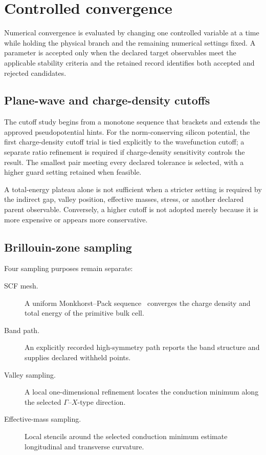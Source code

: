 \section{Controlled convergence}


Numerical convergence is evaluated by changing one controlled variable at a
time while holding the physical branch and the remaining numerical settings
fixed. A parameter is accepted only when the declared target observables meet
the applicable stability criteria and the retained record identifies both
accepted and rejected candidates.

\subsection{Plane-wave and charge-density cutoffs}


The cutoff study begins from a monotone sequence that brackets and extends the
approved pseudopotential hints. For the norm-conserving silicon potential, the
first charge-density cutoff trial is tied explicitly to the wavefunction cutoff;
a separate ratio refinement is required if charge-density sensitivity controls
the result. The smallest pair meeting every declared tolerance is selected,
with a higher guard setting retained when feasible.

A total-energy plateau alone is not sufficient when a stricter setting is
required by the indirect gap, valley position, effective masses, stress, or
another declared parent observable. Conversely, a higher cutoff is not adopted
merely because it is more expensive or appears more conservative.

\subsection{Brillouin-zone sampling}


Four sampling purposes remain separate:

\begin{description}
  \item[SCF mesh.] A uniform Monkhorst--Pack sequence~\cite{monkhorst1976}
    converges the charge density and total energy of the primitive bulk cell.
  \item[Band path.] An explicitly recorded high-symmetry path reports the band
    structure and supplies declared withheld points.
  \item[Valley sampling.] A local one-dimensional refinement locates the
    conduction minimum along the selected $\Gamma$--$X$-type direction.
  \item[Effective-mass sampling.] Local stencils around the selected conduction
    minimum estimate longitudinal and transverse curvature.
\end{description}

